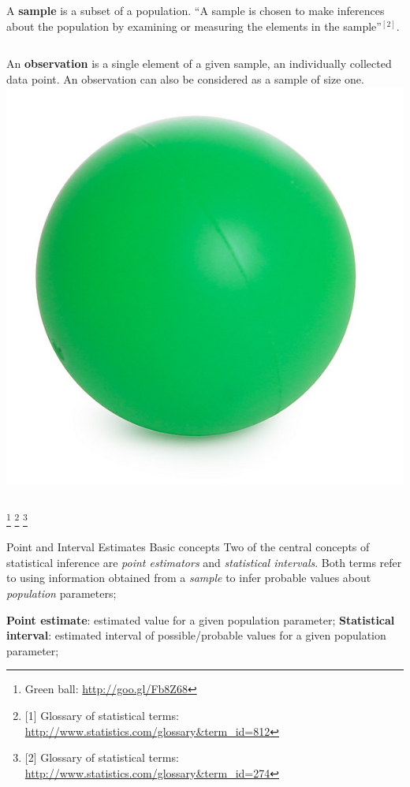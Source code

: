 \documentclass[t]{beamer}
\begin{document}
\begin{ftst}
\begin{columns}
\vhalf
A \textbf{sample} is a subset of a population. ``A sample is chosen to make inferences about the population by examining or measuring the elements in the sample''$^{[2]}$.
\end{columns}
\vone\vhalf
\begin{columns}
\vhalf
An \textbf{observation} is a single element of a given sample, an individually collected data point. An observation can also be considered as a sample of size one.
\includegraphics[width=\textwidth]{../figs/greenball.png}
\end{columns}
\let\thefootnote\relax\footnote{\tiny Green ball: \url{http://goo.gl/Fb8Z68}}
\let\thefootnote\relax\footnote{\tiny [1] Glossary of statistical terms: \url{http://www.statistics.com/glossary&term_id=812}}
\let\thefootnote\relax\footnote{\tiny [2] Glossary of statistical terms: \url{http://www.statistics.com/glossary&term_id=274}}
\end{ftst}


\begin{ftst}
{Point and Interval Estimates}
{Basic concepts}
Two of the central concepts of statistical inference are \textit{point estimators} and \textit{statistical intervals}.
\vone
Both terms refer to using information obtained from a \textit{sample} to infer probable values about \textit{population} parameters;

\bitems \textbf{Point estimate}: estimated value for a given population parameter;
	\spitem \textbf{Statistical interval}: estimated interval of possible/probable values for a given population parameter; 
\eitem
\end{ftst}
\end{document}
